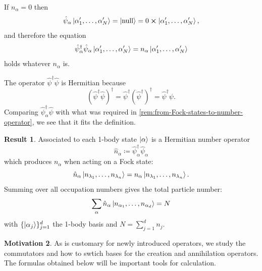 \documentclass{article}
\theoremstyle{definition}
\newtheorem{mot}{Motivation}[section]
\newtheorem{res}[mot]{Result}
\numberwithin{equation}{section}
\begin{document}
If $n_{\alpha}=0$ then 
\[
    \hat{\psi}_{\alpha}
    \ket{\alpha'_{1}, \ldots ,\alpha'_{N}}
    =
    \ket{\text{null}}
    =0 \cross \ket{\alpha'_{1}, \ldots ,\alpha'_{N}},
\]
and therefore the equation 
\[
    \hat{\psi}^{\dagger}_{\alpha}\hat{\psi}_{\alpha}
    \ket{\alpha'_{1}, \ldots ,\alpha'_{N}}
    =
    n_{\alpha}
    \ket{\alpha'_{1}, \ldots ,\alpha'_{N}}
\]
holds whatever $n_{\alpha}$ is. 

The operator $\hat{\psi}^{\dagger}\hat{\psi}$ is 
Hermitian because 
\[
    \left( \hat{\psi}^{\dagger}\hat{\psi} \right) ^{\dagger}
    =
    \hat{\psi}^{\dagger}
    \left( \hat{\psi}^{\dagger} \right) ^{\dagger}
    =
    \hat{\psi}^{\dagger}\psi.
\]
Comparing $\hat{\psi}^{\dagger}_{\alpha}\hat{\psi}$ with 
what was required 
in \cref{rem:from-Fock-states-to-number-operator}, 
we see that it fits the definition.

\begin{graybox}
\begin{res}
    Associated to each 1-body state $\ket{\alpha}$ 
    is a Hermitian number operator 
    \begin{equation}
        \hat{n}_{\alpha}\coloneqq
        \hat{\psi}^{\dagger}_{\alpha}\hat{\psi}_{\alpha}
    \label{eqn:definition-of-the-number-operator}
    \end{equation}
    which produces $n_{\alpha}$ when acting 
    on a Fock state: 
    \begin{equation}
        \hat{n}_{\alpha}
        \ket{n_{\lambda_1}, \ldots ,n_{\lambda_n}}
        =
        n_{\alpha}
        \ket{n_{\lambda_1}, \ldots ,n_{\lambda_n}}.
    \end{equation}
    Summing over all occupation numbers 
    gives the total particle number: 
    \begin{equation}
        \sum_{\alpha}
        \hat{n}_{\alpha}
        \ket{n_{\alpha_1}, \ldots ,n_{\alpha_{d}}}
        =
        N
    \end{equation}
    with $\{\ket{\alpha_{j}}\}_{j=1}^{d}$ 
    the 1-body basis and $N=\sum_{j=1}^{d}n_{j}$. 
\end{res}
\end{graybox}


\begin{mot}
As is customary for newly introduced operators, 
we study the commutators and how to swtich bases 
for the creation and annihilation operators. 
The formulas obtained below will be 
important tools for calculation.
\end{mot}
\end{document}
